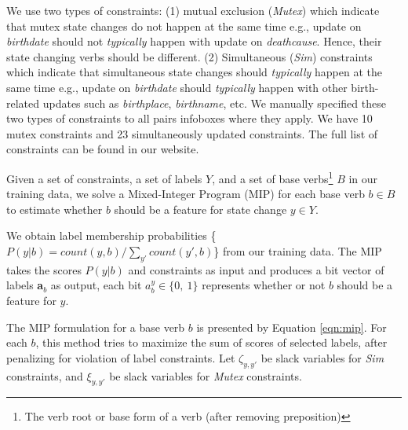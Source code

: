We use two types of constraints:  (1) mutual exclusion (\textit{Mutex}) which indicate that mutex state changes do not happen at the same time 
e.g., update on \textit{birthdate} should not \textit{typically} happen with update on \textit{deathcause}. Hence,  their state changing verbs should be different. %
(2) Simultaneous (\textit{Sim}) constraints which indicate that simultaneous state changes should \textit{typically} happen at the same time e.g., update on \textit{birthdate} should \textit{typically} happen with other birth-related updates such as \textit{birthplace}, \textit{birthname}, %
etc. 
We manually specified these two types  of  constraints to all pairs infoboxes where they apply. We have 10 mutex constraints and 23 simultaneously updated constraints. The full list of constraints can be found in our website. 

Given a set of constraints, a set of labels $Y$, and a set of base verbs\footnote{The verb root or base form of a verb (after removing preposition)} $B$ in our training data, we solve a Mixed-Integer Program (MIP) for each base verb $b \in B$ to estimate whether $b$ should be a feature for state change $y \in Y$. 

We obtain label membership probabilities \{$P(y | b) = count(y, b) / \sum_{y'} count(y', b) $\} from our training data. The MIP takes the scores $P(y | b)$ and constraints as input and produces a bit vector of labels \textbf{a}$_{b}$ as output, each bit  $a_{b}^{y} \in \{0,\ 1\}$ represents whether or not $b$ should be a feature for $y$.

The MIP formulation for a base verb $b$ is presented by Equation \ref{eqn:mip}. For each $b$, this method tries to maximize the sum of scores of selected labels, after penalizing for violation of label constraints. Let $\zeta_{y, y'}$ be slack variables for \textit{Sim} constraints, and $\xi_{y, y'}$ be slack variables for \textit{Mutex} constraints. 

